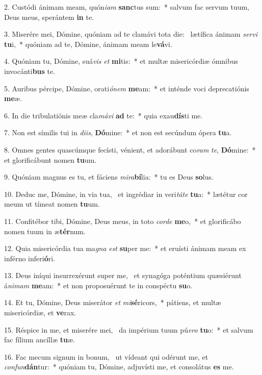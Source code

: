 2. Custódi ánimam meam, quón\textit{i}\textit{am} \textbf{sanc}tus sum:~*  salvum fac servum tuum, Deus meus, sperántem \textbf{in} te.\

3. Miserére mei, Dómine, quóniam ad te clamávi tota die: \dag\  lætífica ánimam \textit{ser}\textit{vi} \textbf{tu}i,~*  quóniam ad te, Dómine, ánimam meam le\textbf{vá}vi.\

4. Quóniam tu, Dómine, suá\textit{vis} \textit{et} \textbf{mi}tis:~*  et multæ misericórdiæ ómnibus invocánti\textbf{bus} te.\

5. Auribus pércipe, Dómine, orati\textit{ó}\textit{nem} \textbf{me}am:~*  et inténde voci deprecatiónis \textbf{me}æ.\

6. In die tribulatiónis meæ cla\textit{má}\textit{vi} \textbf{ad} te:~*  quia exau\textbf{dís}ti me.\

7. Non est símilis tui in \textit{di}\textit{is}, \textbf{Dó}mine:~*  et non est secúndum ópera \textbf{tu}a.\

8. Omnes gentes quascúmque fecísti, vénient, et adorábunt co\textit{ram} \textit{te}, \textbf{Dó}mine:~*  et glorificábunt nomen \textbf{tu}um.\

9. Quóniam magnus es tu, et fáciens \textit{mi}\textit{ra}\textbf{bí}lia:~*  tu es Deus \textbf{so}lus.\

10. Deduc me, Dómine, in via tua, \dag\  et ingrédiar in veri\textit{tá}\textit{te} \textbf{tu}a:~*  lætétur cor meum ut tímeat nomen \textbf{tu}um.\

11. Confitébor tibi, Dómine, Deus meus, in toto \textit{cor}\textit{de} \textbf{me}o,~*  et glorificábo nomen tuum in æ\textbf{tér}num.\

12. Quia misericórdia tua ma\textit{gna} \textit{est} \textbf{su}per me:~*  et eruísti ánimam meam ex inférno inferi\textbf{ó}ri.\

13. Deus iníqui insurrexérunt super me, \dag\  et synagóga poténtium quæsiérunt á\textit{ni}\textit{mam} \textbf{me}am:~*  et non proposuérunt te in conspéctu \textbf{su}o.\

14. Et tu, Dómine, Deus miserátor \textit{et} \textit{mi}\textbf{sé}ricors,~*  pátiens, et multæ misericórdiæ, et \textbf{ve}rax.\

15. Réspice in me, et miserére mei, \dag\  da impérium tuum pú\textit{e}\textit{ro} \textbf{tu}o:~*  et salvum fac fílium ancíllæ \textbf{tu}æ.\

16. Fac mecum signum in bonum, \dag\  ut vídeant qui odérunt me, et \textit{con}\textit{fun}\textbf{dán}tur:~*  quóniam tu, Dómine, adjuvísti me, et consolátus \textbf{es} me.\

